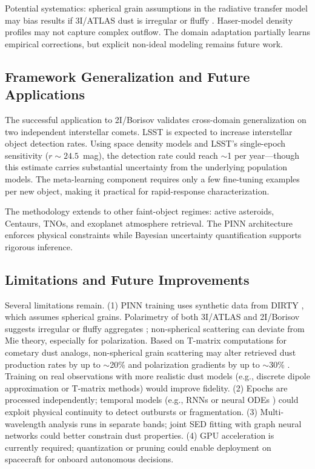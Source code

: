 \documentclass[preprint2]{aastex631}
\begin{document}
Potential systematics: spherical grain assumptions in the radiative transfer model may bias results if 3I/ATLAS dust is irregular or fluffy \citep{kolokolova04}. Haser-model density profiles may not capture complex outflow. The domain adaptation partially learns empirical corrections, but explicit non-ideal modeling remains future work.

\subsection{Framework Generalization and Future Applications}

The successful application to 2I/Borisov validates cross-domain generalization on two independent interstellar comets. LSST is expected to increase interstellar object detection rates. Using \citet{jones18} space density models and LSST's single-epoch sensitivity ($r \sim 24.5$~mag), the detection rate could reach $\sim$1 per year---though this estimate carries substantial uncertainty from the underlying population models. The meta-learning component requires only a few fine-tuning examples per new object, making it practical for rapid-response characterization.

The methodology extends to other faint-object regimes: active asteroids, Centaurs, TNOs, and exoplanet atmosphere retrieval. The PINN architecture enforces physical constraints while Bayesian uncertainty quantification supports rigorous inference.

\subsection{Limitations and Future Improvements}

Several limitations remain. (1) PINN training uses synthetic data from DIRTY \citep{gordon01}, which assumes spherical grains. Polarimetry of both 3I/ATLAS and 2I/Borisov suggests irregular or fluffy aggregates \citep{kolokolova04}; non-spherical scattering can deviate from Mie theory, especially for polarization. Based on T-matrix computations for cometary dust analogs, non-spherical grain scattering may alter retrieved dust production rates by up to $\sim$20\% and polarization gradients by up to $\sim$30\% \citep{kolokolova04,shen11}. Training on real observations with more realistic dust models (e.g., discrete dipole approximation or T-matrix methods) would improve fidelity. (2) Epochs are processed independently; temporal models (e.g., RNNs or neural ODEs \citep{chen18}) could exploit physical continuity to detect outbursts or fragmentation. (3) Multi-wavelength analysis runs in separate bands; joint SED fitting with graph neural networks could better constrain dust properties. (4) GPU acceleration is currently required; quantization or pruning could enable deployment on spacecraft for onboard autonomous decisions.
\end{document}
